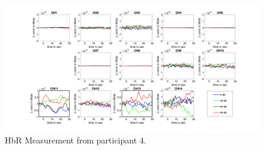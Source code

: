 \begin{figure}[H]
  \centering
    \includegraphics[scale=.35]{bilder/HbR_Mole/sub_lin_s_HbR.png}
  \caption{HbR Measurement from participant 4.}
  \label{fig:somesignal}
\end{figure}

